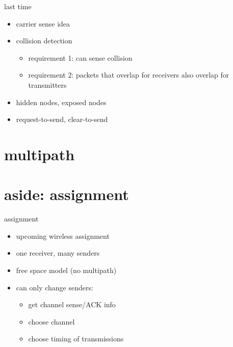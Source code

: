 \date{}
\title{}
\date{}
\usepackage{pgfplots}
\pgfplotsset{compat=1.14}

\begin{frame}
    \titlepage
\end{frame}


\begin{frame}{last time}
    \begin{itemize}
    \item carrier sense idea
    \item collision detection
        \begin{itemize}
        \item requirement 1: can sense collision
        \item requirement 2: packets that overlap for receivers also overlap for transmitters
        \end{itemize}
    \item hidden nodes, exposed nodes
    \item request-to-send, clear-to-send
    \end{itemize}
\end{frame}



\section{multipath}



\section{aside: assignment}
\begin{frame}{assignment}
    \begin{itemize}
    \item upcoming wireless assignment
    \item one receiver, many senders
    \item free space model (no multipath)
    \item can only change senders:
        \begin{itemize}
        \item get channel sense/ACK info
        \item choose channel
        \item choose timing of transmissions
        \end{itemize}
    \end{itemize}
\end{frame}

